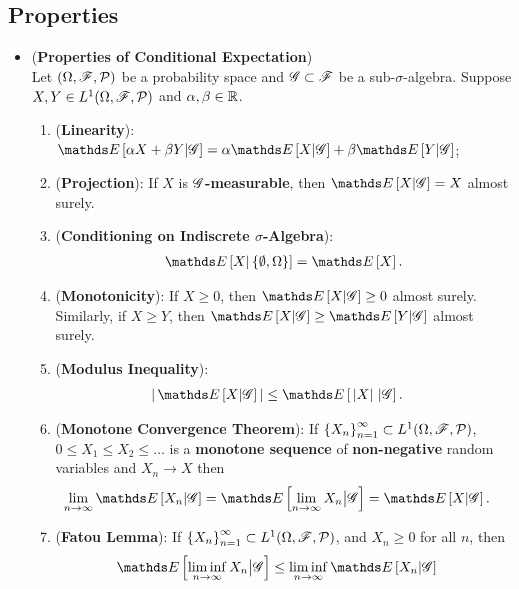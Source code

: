 \documentclass[11pt]{article}
\begin{document}
\subsection{Properties}
\begin{itemize}
\item \begin{proposition} (\textbf{Properties of Conditional Expectation}) \citep{resnick2013probability}\\
Let $(\Omega, {\mathscr F}, {\mathcal P})$ be a probability space and ${\mathscr G} \subset {\mathscr F}$ be a sub-$\sigma$-algebra. Suppose $X, Y \in  L^{1}(\Omega, {\mathscr F}, {\mathcal P})$ and $\alpha, \beta \in {\mathbb R}$.
\begin{enumerate}
\item (\textbf{Linearity}): $\E{}{\alpha X+ \beta Y | \srG} = \alpha \E{}{X| \srG} +\beta  \E{}{Y | \srG}$;
\item (\textbf{Projection}): If $X$ is \textbf{${\mathscr G}$-measurable}, then $\E{}{X | \srG} = X$ almost surely.
\item (\textbf{Conditioning on Indiscrete $\sigma$-Algebra}): 
\begin{align*}
\E{}{X | \set{\emptyset, \Omega}} = \E{}{X}.
\end{align*}
\item (\textbf{Monotonicity}):  If $X \ge 0$, then $\E{}{X | \srG} \ge 0$ almost surely. Similarly, if $X \ge Y$, then $\E{}{X | \srG} \ge \E{}{Y | \srG}$  almost surely.
\item (\textbf{Modulus Inequality}): 
\begin{align*}
\abs{\,\E{}{X | \srG}\,} &\le \E{}{\,\abs{X} \, | \srG}.
\end{align*}
\item (\textbf{Monotone Convergence Theorem}): If  $\left\{X_n\right\}_{n=1}^{\infty} \subset  L^{1}(\Omega, {\mathscr F}, {\mathcal P})$,  $0 \le X_1 \le X_{2}\le \ldots$ is a \textbf{monotone sequence} of \textbf{non-negative} random variables and $X_n \rightarrow X$ then
\begin{align*}
\lim\limits_{n\rightarrow \infty}\E{}{X_n | \srG} &= \E{}{\lim\limits_{n\rightarrow \infty} X_n \big| \srG} = \E{}{X | \srG}.
\end{align*}
\item (\textbf{Fatou Lemma}): If  $\left\{X_n\right\}_{n=1}^{\infty} \subset  L^{1}(\Omega, {\mathscr F}, {\mathcal P})$, and $X_n \ge 0$ for all $n$, then
\begin{align*}
\E{}{\liminf\limits_{n\rightarrow \infty} X_n \big| \srG} &\le \liminf\limits_{n\rightarrow \infty} \E{}{X_n | \srG} 
\end{align*} 

\end{enumerate}
\end{proposition}
\end{itemize}
\end{document}
